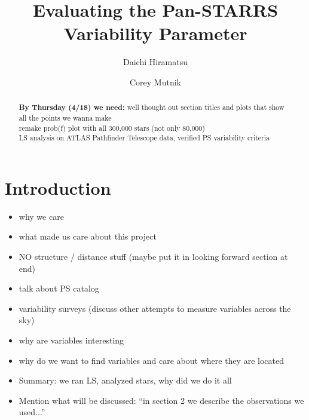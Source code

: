 \documentclass[aps,prb,twocolumn,superscriptaddress]{revtex4-1}
\begin{document}
\title{Evaluating the Pan-STARRS Variability Parameter}


%


\author{Daichi Hiramatsu}
\author{Corey Mutnik}



\begin{abstract}
\textbf{By Thursday (4/18) we need:} well thought out section titles and plots that show all the points we wanna make\\

remake prob(f) plot with all 300,000 stars (not only 80,000)\\

LS analysis on ATLAS Pathfinder Telescope data, verified PS variability criteria
\end{abstract}

\maketitle    




\section{Introduction}

\begin{itemize}
	\item{} why we care
	\item{} what made us care about this project
	\item{} NO structure / distance stuff (maybe put it in looking forward section at end)
	\item{} talk about PS catalog
	\item{} variability surveys (discuss other attempts to measure variables across the sky)
	\item{} why are variables interesting
	\item{} why do we want to find variables and care about where they are located
	\item{} Summary: we ran LS, analyzed stars, why did we do it all
	\item{} Mention what will be discussed: ``in section 2 we describe the observations we used...''
\end{itemize}
\end{document}
